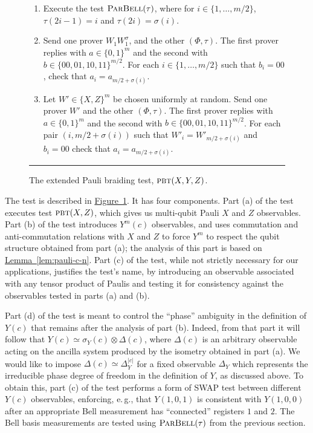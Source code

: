 \documentclass[11pt]{article}
\numberwithin{equation}{section}
\theoremstyle{definition}
\theoremstyle{plain}
\newcommand{\eg}{e.\,g.}
\newcommand{\expref}[2]{\hyperref[#2]{#1~\ref{#2}}}
\newcommand{\pbt}{\textsc{pbt}}
\newcommand{\pbellt}{\textsc{ParBell}}
\begin{document}
\begin{figure}[H]
\begin{itemize}
\begin{enumerate}
\begin{enumerate}
\item[(ii)] Execute the test $\pbellt(\tau)$, where for $i\in \{1,\ldots,m/2\}$, $\tau(2i-1)=i$ and $\tau(2i)=\sigma(i)$.
\item[(iii)] Send one prover $W_1  W_1^\sigma$, and the other $(\Phi,\tau)$. 
    The first prover replies with $a\in\{0, 1 \}^m$ and the second with $b\in \{00,01,10,11\}^{m/2}$. For each
    $i\in\{1,\ldots,m/2\}$ such that $b_i = 00$, check that $a_i  = a_{m/2+\sigma(i)}$. 
		\item[(iv)] Let $W'\in\{X,Z\}^m$ be chosen uniformly at random. Send one prover $W'$ and the other $(\Phi,\tau)$. The first prover replies  with $a\in\{0, 1 \}^m$ and the second with $b\in \{00,01,10,11\}^{m/2}$. For each pair $(i,m/2+\sigma(i))$ such that $W'_i=W'_{m/2+\sigma(i)}$ and $b_i=00$ check that $a_i=a_{m/2+\sigma(i)}$. 
\end{enumerate}
\end{enumerate}
\end{itemize}
\rule[2ex]{\textwidth}{0.5pt}\vspace{-.5cm}
\caption{The extended Pauli braiding test, $\pbt(X,Y,Z)$.}
\label{fig:e-pbt}
\end{figure} %

The test is described in \expref{Figure}{fig:e-pbt}. It has four components. Part (a) of the test executes test $\pbt(X,Z)$, which gives us multi-qubit Pauli $X$ and $Z$ observables. 
Part (b) of the test introduces $Y^m(c)$ observables, and uses commutation and anti-commutation relations with $X$ and $Z$ to force $Y^m$ to respect the qubit structure obtained from part (a); the analysis of this part is based on \expref{Lemma}{lem:pauli-c-n}. Part (c) of the test, while not strictly necessary for our applications, justifies the test's name, by introducing an observable associated with any tensor product of Paulis and testing it for consistency against the observables tested in parts (a) and (b). 

Part (d) of the test is meant to control the ``phase'' ambiguity in the definition of $Y(c)$ that remains after the analysis of part (b). Indeed, from that part it will follow that $Y(c) \simeq \sigma_Y(c) \otimes \Delta(c)$, where $\Delta(c)$ is an arbitrary observable acting on the ancilla system produced by the isometry obtained in part (a). We would like to impose $\Delta(c) \simeq \Delta_Y^{|c|}$ for a fixed observable $\Delta_Y$ which  represents the irreducible phase degree of freedom in the definition of $Y$, as discussed above. To obtain this, part (c) of the test performs a form of SWAP test between different $Y(c)$ observables, %
enforcing, \eg, that  %
$Y(1,0,1)$ is consistent with $Y(1,0,0)$ after an appropriate Bell measurement has ``connected'' registers $1$ and $2$. The Bell basis measurements are tested using $\pbellt(\tau)$ from the previous section. 
\end{document}

